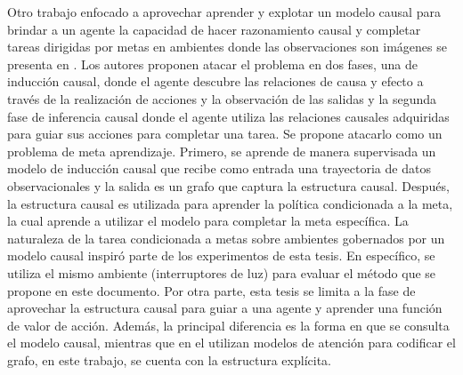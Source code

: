 Otro trabajo enfocado a aprovechar aprender y explotar un modelo causal para brindar a un agente la capacidad de hacer razonamiento causal y completar tareas dirigidas por metas en ambientes donde las observaciones son imágenes se presenta en \cite{nair2019causal}. Los autores proponen atacar el problema en dos fases, una de inducción causal, donde el agente descubre las relaciones de causa y efecto a través de la realización de acciones y la observación de las salidas y la segunda fase de inferencia causal donde el agente utiliza las relaciones causales adquiridas para guiar sus acciones para completar una tarea. Se propone atacarlo como un problema de meta aprendizaje. Primero, se aprende de manera supervisada un modelo de inducción causal que recibe como entrada una trayectoria de datos observacionales y la salida es un grafo que captura la estructura causal. Después, la estructura causal es utilizada para aprender la política condicionada a la meta, la cual aprende a utilizar el modelo para completar la meta específica.	
La naturaleza de la tarea condicionada a metas sobre ambientes gobernados por un modelo causal inspiró parte de los experimentos de esta tesis. En específico, se utiliza el mismo ambiente (interruptores de luz) para evaluar el método que se propone en este documento. Por otra parte, esta tesis se limita a la fase de aprovechar la estructura causal para guiar a una agente y aprender una función de valor de acción. Además, la principal diferencia es la forma en que 
se consulta el modelo causal, mientras que en el \citet{nair2019causal} utilizan 
modelos de atención para codificar el grafo, en este trabajo, se cuenta con la 
estructura explícita.


